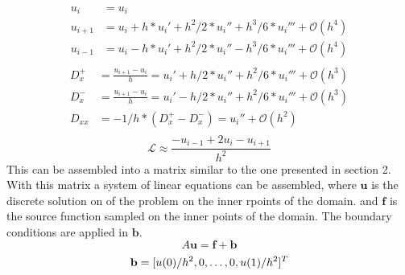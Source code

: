 \documentclass{article}
\begin{document}
\begin{figure}[H]
    \centering
\end{figure}

\begin{align}
    u_i &= u_i\\
    u_{i+1} &= u_i + h * u_i' + h^2/2 * u_i'' + h^3/6 * u_i''' + \mathcal{O}\left(h^4\right)\\
    u_{i-1} &= u_i - h * u_i' + h^2/2 * u_i'' - h^3/6 * u_i''' + \mathcal{O}\left(h^4\right)\\
\end{align}
\begin{align}
    D_x^+ &= \frac{u_{i+1}-u_i}{h} = u_i' + h/2 * u_i'' + h^2/6 * u_i''' + \mathcal{O}\left(h^3\right)\\
    D_x^- &= \frac{u_{i+1}-u_i}{h} = u_i' - h/2 * u_i'' + h^2/6 * u_i''' + \mathcal{O}\left(h^3\right)\\
    D_{xx} &= -1/h*\left(D_x^+ - D_x^-\right) = u_i'' + \mathcal{O}\left(h^2\right)\\
\end{align}
\begin{equation}
    \mathcal{L} \approx \frac{-u_{i-1}+2u_i-u_{i+1}}{h^2}
\end{equation}
This can be assembled into a matrix similar to the one presented in section 2. With this matrix a system of linear equations can be assembled, where $\mathbf{u}$ is the discrete solution on of the problem on the inner rpoints of the domain. and $\mathbf{f}$ is the source function sampled on the inner points of the domain. The boundary conditions are applied in $\mathbf{b}$.
\begin{equation}
    A\mathbf{u} = \mathbf{f}+\mathbf{b}
\end{equation}
\begin{equation}
    \mathbf{b} = [u(0)/h^2, 0, \dots, 0, u(1)/h^2]^T\\
\end{equation}
\end{document}
